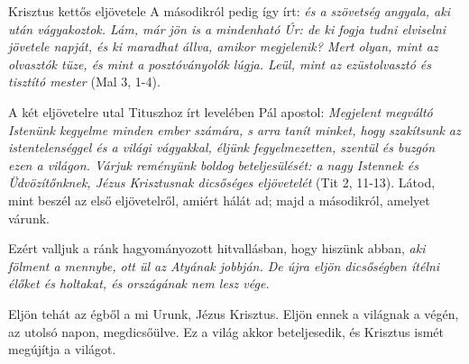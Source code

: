 \documentclass[twoside]{article}
\begin{document}
\begin{lectio}{Krisztus kettős eljövetele}
A másodikról pedig így írt: \textit{és a szövetség angyala, aki után vágyakoztok. Lám, már jön is a mindenható Úr: de ki fogja tudni elviselni jövetele napját, és ki maradhat állva, amikor megjelenik? Mert olyan, mint az olvasztók tüze, és mint a posztóványolók lúgja. Leül, mint az ezüstolvasztó és tisztító mester} (Mal 3, 1-4).

A két eljövetelre utal Tituszhoz írt levelében Pál apostol: \textit{Megjelent megváltó Istenünk kegyelme minden ember számára, s arra tanít minket, hogy szakítsunk az istentelenséggel és a világi vágyakkal, éljünk fegyelmezetten, szentül és buzgón ezen a világon. Várjuk reményünk boldog beteljesülését: a nagy Istennek és Üdvözítőnknek, Jézus Krisztusnak dicsőséges eljövetelét} (Tit 2, 11-13). Látod, mint beszél az első eljövetelről, amiért hálát ad; majd a másodikról, amelyet várunk.

Ezért valljuk a ránk hagyományozott hitvallásban, hogy hiszünk abban, \textit{aki fölment a mennybe, ott ül az Atyának jobbján. De újra eljön dicsőségben ítélni élőket és holtakat, és országának nem lesz vége.}

Eljön tehát az égből a mi Urunk, Jézus Krisztus. Eljön ennek a világnak a végén, az utolsó napon, megdicsőülve. Ez a világ akkor beteljesedik, és Krisztus ismét megújítja a világot.
\end{lectio}

\end{document}
